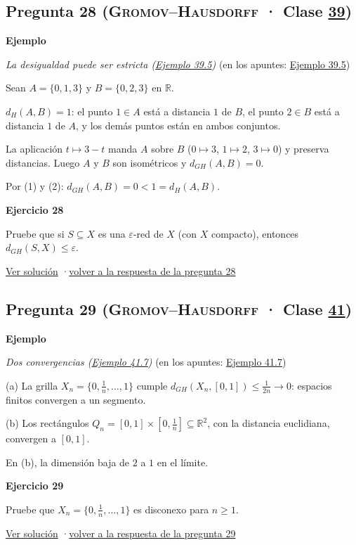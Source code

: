 \documentclass[11pt,a4paper]{article}
\newcommand{\R}{\mathbb{R}}\newcommand{\N}{\mathbb{N}}\newcommand{\Q}{\mathbb{Q}}
\providecommand{\lt}{<}\providecommand{\gt}{>}
\newcommand{\bloque}[1]{\par\smallskip\noindent\textbf{\color{acento}#1}\par}
\begin{document}
\subsection*{\hypertarget{e-28}{}Pregunta 28 \normalfont\small(\textsc{Gromov–Hausdorff} · Clase \href{https://decostruttivismo.github.io/MAT2514-repaso/pdf/MAT2514_apuntes_completos.pdf\#nameddest=section.39}{39})}
\bloque{Ejemplo}
\textit{La desigualdad puede ser estricta (\href{https://decostruttivismo.github.io/MAT2514-repaso/pdf/MAT2514_apuntes_completos.pdf\#nameddest=teorema.39.5}{Ejemplo 39.5})} {\small(en los apuntes: \href{https://decostruttivismo.github.io/MAT2514-repaso/pdf/MAT2514_apuntes_completos.pdf\#nameddest=teorema.39.5}{Ejemplo 39.5})}
\begin{pasos}
\item[] Sean $A=\{0,1,3\}$ y $B=\{0,2,3\}$ en $\R$.
\item[(1)] $d_H(A,B)=1$: el punto $1\in A$ está a distancia $1$ de $B$, el punto $2\in B$ está a distancia $1$ de $A$, y los demás puntos están en ambos conjuntos.
\item[(2)] La aplicación $t\mapsto3-t$ manda $A$ sobre $B$ ($0\mapsto3$, $1\mapsto2$, $3\mapsto0$) y preserva distancias. Luego $A$ y $B$ son isométricos y $d_{GH}(A,B)=0$.
\item[] Por (1) y (2): $d_{GH}(A,B)=0\lt 1=d_H(A,B)$.
\end{pasos}
\bloque{\hypertarget{x-28}{}Ejercicio 28}
Pruebe que si $S\subseteq X$ es una $\varepsilon$-red de $X$ (con $X$ compacto), entonces $d_{GH}(S,X)\le\varepsilon$.
\par{\small \hyperlink{s-28}{Ver solución} \quad·\quad \hyperlink{r-28}{volver a la respuesta de la pregunta 28}}
\subsection*{\hypertarget{e-29}{}Pregunta 29 \normalfont\small(\textsc{Gromov–Hausdorff} · Clase \href{https://decostruttivismo.github.io/MAT2514-repaso/pdf/MAT2514_apuntes_completos.pdf\#nameddest=section.41}{41})}
\bloque{Ejemplo}
\textit{Dos convergencias (\href{https://decostruttivismo.github.io/MAT2514-repaso/pdf/MAT2514_apuntes_completos.pdf\#nameddest=teorema.41.7}{Ejemplo 41.7})} {\small(en los apuntes: \href{https://decostruttivismo.github.io/MAT2514-repaso/pdf/MAT2514_apuntes_completos.pdf\#nameddest=teorema.41.7}{Ejemplo 41.7})}
\begin{pasos}
\item[] (a) La grilla $X_n=\{0,\frac1n,\dots,1\}$ cumple $d_{GH}(X_n,[0,1])\le\frac1{2n}\to0$: espacios finitos convergen a un segmento.
\item[] (b) Los rectángulos $Q_n=[0,1]\times[0,\frac1n]\subseteq\R^2$, con la distancia euclidiana, convergen a $[0,1]$.
\item[] En (b), la dimensión baja de $2$ a $1$ en el límite.
\end{pasos}
\bloque{\hypertarget{x-29}{}Ejercicio 29}
Pruebe que $X_n=\{0,\frac1n,\dots,1\}$ es disconexo para $n\ge1$.
\par{\small \hyperlink{s-29}{Ver solución} \quad·\quad \hyperlink{r-29}{volver a la respuesta de la pregunta 29}}
\end{document}
